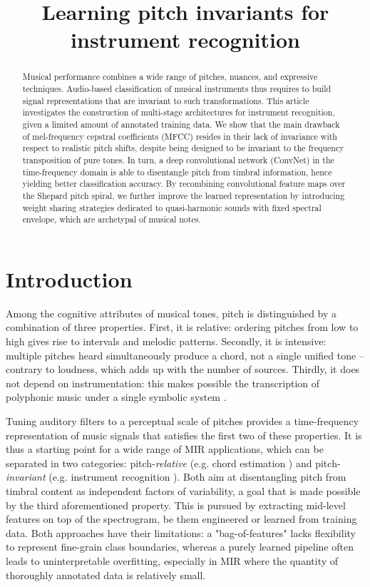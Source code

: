 \documentclass{article}
\title{Learning pitch invariants for instrument recognition}
\makeatletter
\newcommand*{\eg}{e.g.\@\xspace}
\makeatother
\begin{document}
%
\maketitle
%
\begin{abstract}
Musical performance combines a wide range of pitches, nuances,
and expressive techniques.
Audio-based classification of musical instruments thus requires to
build signal representations that are invariant to such transformations.
This article investigates the construction
of multi-stage architectures for instrument recognition,
given a limited amount of annotated training data.
We show that the main drawback of mel-frequency cepstral
coefficients (MFCC) resides in their lack of invariance with respect to
realistic pitch shifts, despite being designed to be invariant
to the frequency transposition of pure tones.
In turn, a deep convolutional network (ConvNet)
in the time-frequency domain is able to disentangle pitch from
timbral information, hence yielding better classification accuracy.
By recombining convolutional feature maps over the Shepard pitch spiral,
we further improve the learned representation
by introducing weight sharing strategies dedicated to
quasi-harmonic sounds with fixed spectral envelope,
which are archetypal of musical notes.
\end{abstract}

\section{Introduction}\label{sec:introduction}
Among the cognitive attributes of musical tones, pitch is distinguished
by a combination of three properties.
First, it is relative: ordering pitches from low to high gives rise to
intervals and melodic patterns.
Secondly, it is intensive: multiple pitches heard simultaneously produce
a chord, not a single unified tone -- contrary to loudness, which adds
up with the number of sources.
Thirdly, it does not depend on instrumentation: this makes possible
the transcription of polyphonic music under a single symbolic system
\cite{deCheveigne2005}.

Tuning auditory filters to a perceptual scale of pitches provides a
time-frequency representation of music signals that satisfies the first two of these properties.
It is thus a starting point for a wide range of MIR applications,
which can be separated in two categories: pitch-\emph{relative}
(\eg chord estimation \cite{Humphrey2012})
and pitch-\emph{invariant} (\eg instrument recognition \cite{Eronen2000}).
Both aim at disentangling pitch from timbral content as independent
factors of variability, a goal that is made possible by the third aforementioned property.
This is pursued by extracting mid-level features on top of the spectrogram,
be them engineered or learned from training data.
Both approaches have their limitations: a "bag-of-features" lacks flexibility
to represent fine-grain class boundaries, whereas a purely learned pipeline
often leads to uninterpretable overfitting, especially in MIR where the quantity
of thoroughly annotated data is relatively small.
\end{document}
